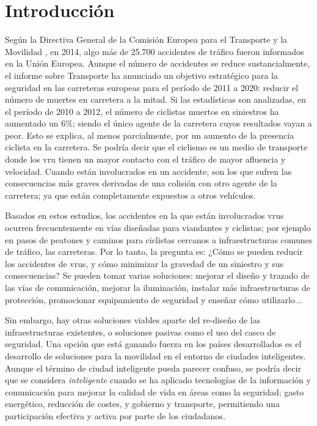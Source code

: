 \chapter{Introducción}
Según la Directiva General de la Comisión Europea para el Transporte y la
Movilidad \cite{road_safety_eu}, en 2014, algo más de 25.700 accidentes de
tráfico fueron informados en la Unión Europea. Aunque el número de accidentes
se reduce sustancialmente, el informe sobre Transporte
\cite{road_safety_vademecum} ha anunciado un objetivo estratégico para la
seguridad en las carreteras europeas para el período de 2011 a 2020: reducir el
número de muertes en carretera a la mitad. Si las estadísticas son analizadas,
en el período de 2010 a 2012, el número de ciclistas muertos en siniestros ha
aumentado un 6\%; siendo el único agente de la carretera cuyos resultados vayan
a peor. Esto se explica, al menos parcialmente, por un aumento de la presencia
ciclista en la carretera. Se podría decir que el ciclismo es un medio de
transporte donde los \gls{vru} tienen un mayor contacto con el tráfico de mayor
afluencia y velocidad. Cuando están involucrados en un accidente, son los que
sufren las consecuencias más graves derivadas de una colisión con otro agente
de la carretera; ya que están completamente expuestos a otros vehículos.

Basados en estos estudios, los accidentes en la que están involucrados
\gls{vru}s ocurren frecuentemente en vías diseñadas para viandantes y ciclistas;
por ejemplo en pasos de peatones y caminos para ciclistas cercanos a
infraestructuras comunes de tráfico, las carreteras. Por lo tanto, la pregunta
es: ¿Cómo se pueden reducir los accidentes de \gls{vru}s, y cómo minimizar la
gravedad de un siniestro y sus consecuencias? Se pueden tomar varias
soluciones: mejorar el diseño y trazado de las vías de comunicación, mejorar la
iluminación, instalar más infraestructuras de protección, promocionar
equipamiento de seguridad y enseñar cómo utilizarlo...

Sin embargo, hay otras soluciones viables aparte del re-diseño de las
infraestructuras existentes, o soluciones pasivas como el uso del casco de
seguridad. Una opción que está ganando fuerza en los países desarrollados es el
desarrollo de soluciones para la movilidad en el entorno de ciudades
inteligentes. Aunque el término de ciudad inteligente pueda parecer confuso,
se podría decir que se considera \emph{inteligente} cuando se ha aplicado
tecnologías de la información y comunicación para mejorar la calidad de vida en
áreas como la seguridad; gasto energético, reducción de costes, y gobierno y
transporte, permitiendo una participación efectiva y activa por parte de los
ciudadanos.

